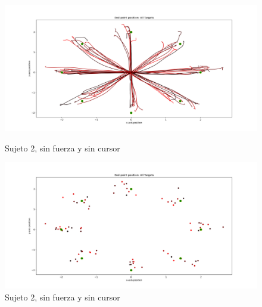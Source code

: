 \documentclass[a4paper,11pt, oneside]{book}
\begin{document}
\begin{figure}[H]
	\begin{minipage}[b]{0.5\linewidth}
		\centering
		\includegraphics[width=\linewidth]{sujeto2/no_force_no_cursor/trayectorias}
		\caption{Sujeto 2, sin fuerza y sin cursor}
		\label{2-fase3-1}
	\end{minipage}
	\hspace{0.5cm}
	\begin{minipage}[b]{0.5\linewidth}
		\centering
		\includegraphics[width=\linewidth]{sujeto2/no_force_no_cursor/trayectorias_puntos}
		\caption{Sujeto 2, sin fuerza y sin cursor}
		\label{2-fase3-2}
	\end{minipage}
\end{figure}
\end{document}

